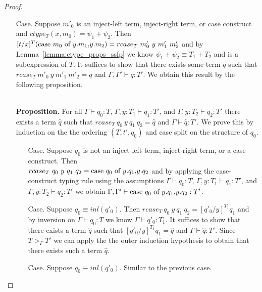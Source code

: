 \begin{proof}
\begin{itemize}
\begin{itemize}
  \item[Case.] Suppose $m'_0$ is an inject-left term, inject-right term, or case construct and $ctype_T(x,m_0) = \psi_1+\psi_2$.  Then\\
    $[t/x]^{T} (\mbox{case}\ m_0\ \text{of}\ y\text{.}m_1\text{,}y\text{.}m_2) = rcase_{T}\ m'_0\ y\ m'_1\ m'_2$ and by Lemma~\ref{lemma:ctype_props_ssfp} we know
    $\psi_1 + \psi_2 \equiv T_1+T_2$ and is a subexpression of $T$.
    It suffices to show that there exists some term
    $q$ such that $rcase_{T}\ m'_0\ y\ m'_1\ m'_2 = q$ and $\Gamma, \Gamma' \vdash q:T'$.  We obtain this
    result by the following proposition.
    
    \ \\
    {\bf Proposition.} For all $\Gamma \vdash q_0:T$, $\Gamma, y:T_1 \vdash q_1:T'$, 
    and $\Gamma, y:T_2 \vdash q_2:T'$ there exists a term $\hat{q}$ such that 
    $rcase_{T}\ q_0\ y\ q_1\ q_2 = \hat{q}$ and $\Gamma \vdash \hat{q}:T'$.  
    We prove this by induction on the the ordering $(T, t', q_0)$ and case split on the structure of $q_0$.
    \begin{itemize}
    \item[Case.] Suppose $q_0$ is not an inject-left term, inject-right term, or a case construct.  Then\\
      $rcase_{T}\ q_0\ y\ q_1\ q_2 = \mbox{case}\ q_0\ \text{of}\ y\text{.}q_1\text{,}y\text{.}q_2$ and by applying the case-construct typing rule
      using the assumptions $\Gamma \vdash q_0:T$, $\Gamma, y:T_1 \vdash q_1:T'$, 
      and $\Gamma, y:T_2 \vdash q_2:T'$ we obtain $\Gamma,\Gamma' \vdash \mbox{case}\ q_0\ \text{of}\ y\text{.}q_1\text{,}y\text{.}q_2:T'$.
      
    \item[Case.] Suppose $q_0 \equiv inl(q'_0)$.  Then $rcase_{T}\ q_0\ y\ q_1\ q_2 = [q'_0/y]^{T_1} q_1$ and
      by inversion on $\Gamma \vdash q_0:T$ we know $\Gamma \vdash q'_0:T_1$.  It suffices to show that there
      exists a term $\hat{q}$ such that $[q'_0/y]^{T_1} q_1 = \hat{q}$  and $\Gamma \vdash \hat{q}:T'$.  
      Since $T >_{\Gamma} T'$ we can apply the the outer induction hypothesis to obtain that there exists 
      such a term $\hat{q}$.
      
    \item[Case.] Suppose $q_0 \equiv inl(q'_0)$.  Similar to the previous case.
      

\end{itemize}
\end{itemize}
\end{itemize}
\end{proof}
